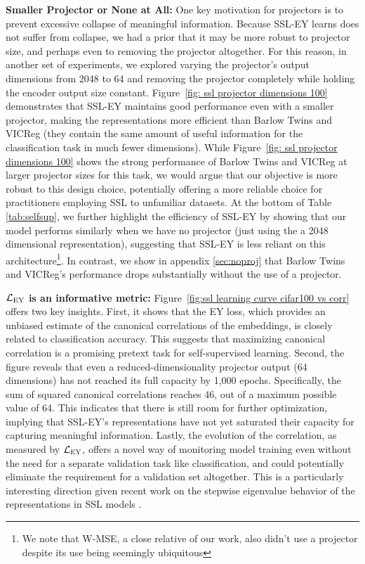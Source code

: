 \textbf{Smaller Projector or None at All:}
One key motivation for projectors is to prevent excessive collapse of meaningful information. Because SSL-EY learns does not suffer from collapse, we had a prior that it may be more robust to projector size, and perhaps even to removing the projector altogether.
For this reason, in another set of experiments, we explored varying the projector's output dimensions from 2048 to 64 and removing the projector completely while holding the encoder output size constant. Figure~\ref{fig: ssl projector dimensions 100} demonstrates that SSL-EY maintains good performance even with a smaller projector, making the representations more efficient than Barlow Twins and VICReg (they contain the same amount of useful information for the classification task in much fewer dimensions). While Figure~\ref{fig: ssl projector dimensions 100} shows the strong performance of Barlow Twins and VICReg at larger projector sizes for this task, we would argue that our objective is more robust to this design choice, potentially offering a more reliable choice for practitioners employing SSL to unfamiliar datasets. At the bottom of Table \ref{tab:selfsup}, we further highlight the efficiency of SSL-EY by showing that our model performs similarly when we have no projector (just using the a 2048 dimensional representation), suggesting that SSL-EY is less reliant on this architecture\footnote{We note that W-MSE, a close relative of our work, also didn't use a projector despite its use being seemingly ubiquitous}. In contrast, we show in appendix \ref{sec:noproj} that Barlow Twins and VICReg's performance drops substantially without the use of a projector.

\textbf{$\mathcal{L}_\text{EY}$ is an informative metric:} Figure~\ref{fig:ssl learning curve cifar100 vs corr} offers two key insights. First, it shows that the EY loss, which provides an unbiased estimate of the canonical correlations of the embeddings, is closely related to classification accuracy. This suggests that maximizing canonical correlation is a promising pretext task for self-supervised learning. Second, the figure reveals that even a reduced-dimensionality projector output (64 dimensions) has not reached its full capacity by 1,000 epochs. Specifically, the sum of squared canonical correlations reaches 46, out of a maximum possible value of 64. This indicates that there is still room for further optimization, implying that SSL-EY's representations have not yet saturated their capacity for capturing meaningful information. Lastly, the evolution of the correlation, as measured by $\mathcal{L}_\text{EY}$, offers a novel way of monitoring model training even without the need for a separate validation task like classification, and could potentially eliminate the requirement for a validation set altogether. This is a particularly interesting direction given recent work on the stepwise eigenvalue behavior of the representations in SSL models \cite{simon2023stepwise}.

